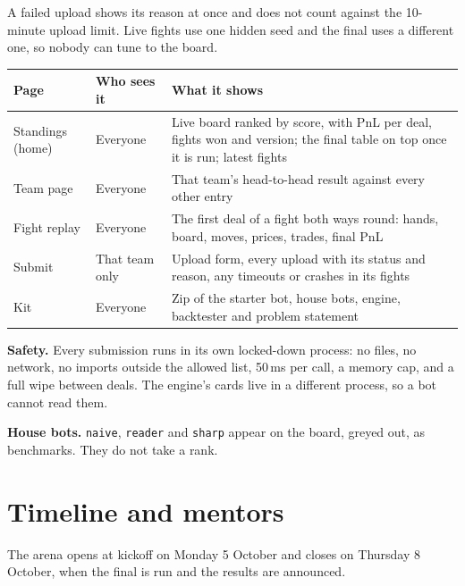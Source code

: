 \documentclass[11pt,a4paper]{article}
\newcommand{\code}[1]{\texttt{#1}}
\begin{document}
A failed upload shows its reason at once and does not count against the 10-minute upload
limit. Live fights use one hidden seed and the final uses a different one, so nobody can tune
to the board.

\begin{center}
\begin{tabularx}{\linewidth}{@{}l l L@{}}
\toprule
\textbf{Page} & \textbf{Who sees it} & \textbf{What it shows} \\
\midrule
Standings (home) & Everyone & Live board ranked by score, with PnL per deal, fights won and version; the
  final table on top once it is run; latest fights \\
Team page & Everyone & That team's head-to-head result against every other entry \\
Fight replay & Everyone & The first deal of a fight both ways round: hands, board, moves,
  prices, trades, final PnL \\
Submit & That team only & Upload form, every upload with its status and reason, any timeouts
  or crashes in its fights \\
Kit & Everyone & Zip of the starter bot, house bots, engine, backtester and problem statement \\
\bottomrule
\end{tabularx}
\end{center}

\textbf{Safety.} Every submission runs in its own locked-down process: no files, no network,
no imports outside the allowed list, 50\,ms per call, a memory cap, and a full wipe between
deals. The engine's cards live in a different process, so a bot cannot read them.

\textbf{House bots.} \code{naive}, \code{reader} and \code{sharp} appear on the board, greyed
out, as benchmarks. They do not take a rank.

\section{Timeline and mentors}

The arena opens at kickoff on Monday 5 October and closes on Thursday 8 October, when the final
is run and the results are announced.
\end{document}
